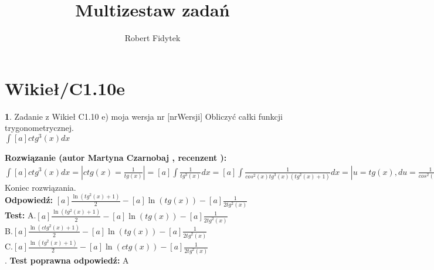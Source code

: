 \documentclass[12pt, a4paper]{article}
\title{Multizestaw zadań}
\author{Robert Fidytek}
\date{}
\theoremstyle{definition} %
\newtheorem{zad}{}
\newcommand{\kategoria}[1]{\section{#1}} %
\newcommand{\zadStart}[1]{\begin{zad}#1\newline} %
\newcommand{\zadStop}{\end{zad}}   %
\newcommand{\rozwStart}[2]{\noindent \textbf{Rozwiązanie (autor #1 , recenzent #2): }\newline} %
\newcommand{\rozwStop}{\newline}                                            %
\newcommand{\odpStart}{\noindent \textbf{Odpowiedź:}\newline}    %
\newcommand{\odpStop}{\newline}                                             %
\newcommand{\testStart}{\noindent \textbf{Test:}\newline} %
\newcommand{\testStop}{\newline} %
\newcommand{\kluczStart}{\noindent \textbf{Test poprawna odpowiedź:}\newline} %
\newcommand{\kluczStop}{\newline} %
\begin{document}
\maketitle


\kategoria{Wikieł/C1.10e}
\zadStart{Zadanie z Wikieł C1.10 e) moja wersja nr [nrWersji]}
Obliczyć całki funkcji trygonometrycznej.\\
$\int [a] ctg^{3}(x) dx$\\
\zadStop
\rozwStart{Martyna Czarnobaj}{}
	$\int [a] ctg^{3}(x) dx = |ctg(x) = \frac{1}{tg(x)}| = [a] \int \frac{1}{tg^{3}(x)} dx = [a] \int \frac{1}{cos^{2}(x)tg^{3}(x)(tg^{2}(x)+1)} dx = |u=tg(x), du=\frac{1}{cos^{2}(x)} dx| = [a] \int \frac{1}{u^{5}+u^{3}} du = [a] \int \frac{1}{u^{3}(u^{2}+1)} du = [a] \int \frac{u}{u^{2}+1} - \frac{1}{u} + \frac{1}{u^{3}} du = [a] (\int \frac{u}{u^{2}+1} du - \int \frac{1}{u} du + \int \frac{1}{u^{3}} du) = [a] (\frac{\ln (u^{2}+1)}{2} - \ln(u) + (-\frac{1}{2u^{2}})) = [a]\frac{\ln (u^{2}+1)}{2} - [a]\ln(u) - [a]\frac{1}{2u^{2}} = [a]\frac{\ln (tg^{2}(x)+1)}{2} - [a]\ln(tg(x)) - [a]\frac{1}{2tg^{2}(x)}$\\ 


Koniec rozwiązania.\\
\rozwStop
\odpStart
$[a]\frac{\ln (tg^{2}(x)+1)}{2} - [a]\ln(tg(x)) - [a]\frac{1}{2tg^{2}(x)}$\\
\odpStop
\testStart
A.$[a]\frac{\ln (tg^{2}(x)+1)}{2} - [a]\ln(tg(x)) - [a]\frac{1}{2tg^{2}(x)}$\\
B.$[a]\frac{\ln (ctg^{2}(x)+1)}{2} - [a]\ln(tg(x)) - [a]\frac{1}{2tg^{2}(x)}$\\
C.$[a]\frac{\ln (tg^{2}(x)+1)}{2} - [a]\ln(ctg(x)) - [a]\frac{1}{2tg^{2}(x)}$\\
.
\testStop
\kluczStart
A
\kluczStop
\end{document}
